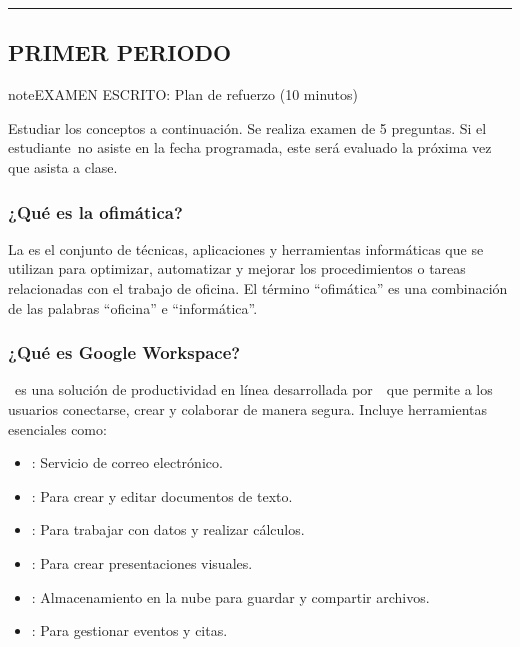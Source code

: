 \documentclass[letterpaper,10pt,spanish]{sphinxmanual}
\begin{document}
\bigskip\hrule\bigskip



\subsection{PRIMER PERIODO}
\label{\detokenize{1_guias/10ofimatica/G1019:primer-periodo}}
\begin{sphinxadmonition}{note}{EXAMEN ESCRITO: Plan de refuerzo (10 minutos)}

\sphinxAtStartPar
Estudiar los conceptos a continuación. Se realiza examen de 5 preguntas. Si el estudiante no asiste en la fecha programada, este será evaluado la próxima vez que asista a clase.
\end{sphinxadmonition}


\subsubsection{¿Qué es la ofimática?}
\label{\detokenize{1_guias/10ofimatica/G1019:que-es-la-ofimatica}}
\sphinxAtStartPar
La  es el conjunto de técnicas, aplicaciones y herramientas informáticas que se utilizan para optimizar, automatizar y mejorar los procedimientos o tareas relacionadas con el trabajo de oficina. El término “ofimática” es una combinación de las palabras “oficina” e “informática”.


\subsubsection{¿Qué es Google Workspace?}
\label{\detokenize{1_guias/10ofimatica/G1019:que-es-google-workspace}}
\sphinxAtStartPar
{} es una solución de productividad en línea desarrollada por  que permite a los usuarios conectarse, crear y colaborar de manera segura. Incluye herramientas esenciales como:
\begin{itemize}
\item {} 
\sphinxAtStartPar
{}: Servicio de correo electrónico.

\item {} 
\sphinxAtStartPar
{}: Para crear y editar documentos de texto.

\item {} 
\sphinxAtStartPar
{}: Para trabajar con datos y realizar cálculos.

\item {} 
\sphinxAtStartPar
{}: Para crear presentaciones visuales.

\item {} 
\sphinxAtStartPar
{}: Almacenamiento en la nube para guardar y compartir archivos.

\item {} 
\sphinxAtStartPar
{}: Para gestionar eventos y citas.

\end{itemize}
\end{document}
